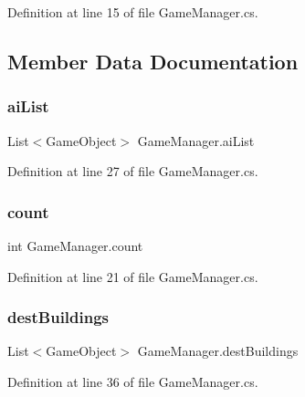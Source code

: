 Definition at line 15 of file Game\+Manager.\+cs.



\subsection{Member Data Documentation}
\hypertarget{class_game_manager_ae36910f35ee71379d3f60e9fade57abc}{}\label{class_game_manager_ae36910f35ee71379d3f60e9fade57abc} 
\subsubsection{\texorpdfstring{ai\+List}{aiList}}
{\footnotesize\ttfamily List$<$Game\+Object$>$ Game\+Manager.\+ai\+List}



Definition at line 27 of file Game\+Manager.\+cs.

\hypertarget{class_game_manager_ab49abc66427bbe2c6c1c8a38b58bafae}{}\label{class_game_manager_ab49abc66427bbe2c6c1c8a38b58bafae} 
\subsubsection{\texorpdfstring{count}{count}}
{\footnotesize\ttfamily int Game\+Manager.\+count}



Definition at line 21 of file Game\+Manager.\+cs.

\hypertarget{class_game_manager_a7207a32a9e7c552a999a850b2bc82579}{}\label{class_game_manager_a7207a32a9e7c552a999a850b2bc82579} 
\subsubsection{\texorpdfstring{dest\+Buildings}{destBuildings}}
{\footnotesize\ttfamily List$<$Game\+Object$>$ Game\+Manager.\+dest\+Buildings}



Definition at line 36 of file Game\+Manager.\+cs.

\hypertarget{class_game_manager_a9400f161998957696533cc5e7925d9a1}{}\label{class_game_manager_a9400f161998957696533cc5e7925d9a1} 
